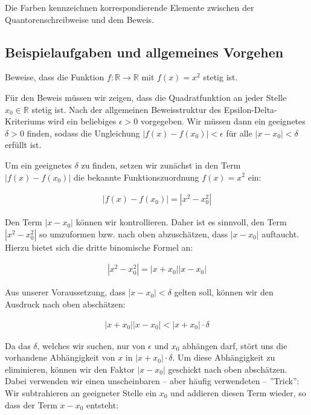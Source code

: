 \documentclass[fontsize=9pt,
               parskip=half-,
               DIV=14,
               listof=chapterentry,
               tocflat]{scrbook}
\begin{document}
Die Farben kennzeichnen korrespondierende Elemente zwischen der Quantorenschreibweise und dem Beweis.

\subsection{Beispielaufgaben und allgemeines Vorgehen}

\begin{exercise*}
Beweise, dass die Funktion $f:\mathbb {R} \to \mathbb {R} $ mit $f(x)=x^{2}$ stetig ist.

\end{exercise*}

\begin{solutionprocess*}
Für den Beweis müssen wir zeigen, dass die Quadratfunktion an jeder Stelle $x_{0}\in \mathbb {R} $ stetig ist. Nach der allgemeinen Beweisstruktur des Epsilon-Delta-Kriteriums wird ein beliebiges $\epsilon >0$ vorgegeben. Wir müssen dann ein geeignetes $\delta >0$ finden, sodass die Ungleichung $|f(x)-f(x_{0})|<\epsilon $ für alle $|x-x_{0}|<\delta $ erfüllt ist.

Um ein geeignetes $\delta $ zu finden, setzen wir zunächst in den Term $|f(x)-f(x_{0})|$ die bekannte Funktionszuordnung $f(x)=x^{2}$ ein:

\begin{align*}
|f(x)-f(x_{0})|=\left|x^{2}-x_{0}^{2}\right|
\end{align*}

Den Term $|x-x_{0}|$ können wir kontrollieren. Daher ist es sinnvoll, den Term $\left|x^{2}-x_{0}^{2}\right|$ so umzuformen bzw. nach oben abzuschätzen, dass $|x-x_{0}|$ auftaucht. Hierzu bietet sich die dritte binomische Formel an:

\begin{align*}
|x^{2}-x_{0}^{2}|=|x+x_{0}||x-x_{0}|
\end{align*}

Aus unserer Voraussetzung, dass $|x-x_{0}|<\delta $ gelten soll, können wir den Ausdruck nach oben abschätzen:

\begin{align*}
|x+x_{0}||x-x_{0}|<|x+x_{0}|\cdot \delta 
\end{align*}

Da das $\delta $, welches wir suchen, nur von $\epsilon $ und $x_{0}$ abhängen darf, stört uns die vorhandene Abhängigkeit von $x$ in $|x+x_{0}|\cdot \delta $. Um diese Abhängigkeit zu eliminieren, können wir den Faktor $|x-x_{0}|$ geschickt nach oben abschätzen. Dabei verwenden wir einen unscheinbaren – aber häufig verwendeten – {''}Trick{''}: Wir subtrahieren an geeigneter Stelle ein $x_{0}$ und addieren diesen Term wieder, so dass der Term $x-x_{0}$ entsteht:


\end{solutionprocess*}
\end{document}
